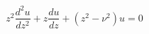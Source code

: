 \documentclass[12pt]{article}
\begin{document}
\begin{displaymath}
z^2\frac{d^2u}{dz^2} + z\frac{du}{dz} + (z^2 - \nu^2)u = 0
\end{displaymath}
\end{document}
